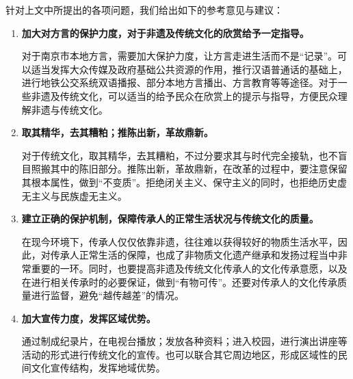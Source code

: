 \documentclass[12pt]{article}%
\begin{document}
针对上文中所提出的各项问题，我们给出如下的参考意见与建议：
\begin{enumerate}
  \item \textbf{加大对方言的保护力度，对于非遗及传统文化的欣赏给予一定指导。}

  对于南京市本地方言，需要加大保护力度，让方言走进生活而不是“记录”。可以适当发挥大众传媒及政府基础公共资源的作用，推行汉语普通话的基础上，进行地铁公交系统双语播报、部分本地方言播出、方言教育等等途径。对于一些非遗及传统文化，可以适当的给予民众在欣赏上的提示与指导，方便民众理解非遗与传统文化。

  \item \textbf{取其精华，去其糟粕；推陈出新，革故鼎新。}

  对于传统文化，取其精华，去其糟粕，不过分要求其与时代完全接轨，也不盲目照搬其中的陈旧部分。推陈出新，革故鼎新，在改革的过程中，要注意保留其根本属性，做到“不变质”。拒绝闭关主义、保守主义的同时，也拒绝历史虚无主义与民族虚无主义。

  \item \textbf{建立正确的保护机制，保障传承人的正常生活状况与传统文化的质量。}

  在现今环境下，传承人仅仅依靠非遗，往往难以获得较好的物质生活水平，因此，对传承人正常生活的保障，也成了非物质文化遗产继承和发扬过程当中非常重要的一环。同时，也要提高非遗及传统文化传承人的文化传承意愿，以及在进行相关传承时的必要保证，做到“有物可传”。还要对传承人的文化传承质量进行监督，避免“越传越差”的情况。

  \item \textbf{加大宣传力度，发挥区域优势。}

  通过制成纪录片，在电视台播放；发放各种资料；进入校园，进行演出讲座等活动的形式进行传统文化的宣传。也可以联合其它周边地区，形成区域性的民间文化宣传结构，发挥地域优势。
\end{enumerate}

\appendix
\end{document}
